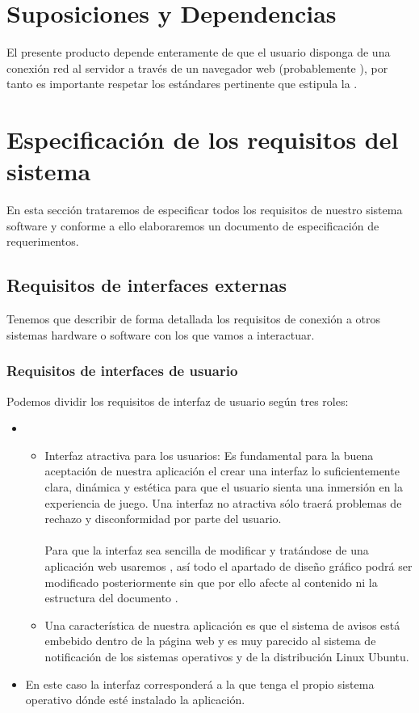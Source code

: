 \section{Suposiciones y Dependencias}
El presente producto depende enteramente de que el usuario disponga de una
conexión red al servidor a través de un navegador web (probablemente
), por tanto es importante respetar los estándares pertinente
que estipula la .

\section{Especificación de los requisitos del sistema}
En esta sección trataremos de especificar todos los requisitos de nuestro
sistema software y conforme a ello elaboraremos un documento de especificación
de requerimentos.
\subsection{Requisitos de interfaces externas}
Tenemos que describir de forma detallada los requisitos de conexión a otros
sistemas hardware o software con los que vamos a interactuar.
\subsubsection{Requisitos de interfaces de usuario}
Podemos dividir los requisitos de interfaz de usuario según tres roles:

\begin{itemize}
\item {}
  \begin{itemize}
  \item Interfaz atractiva para los usuarios: Es fundamental para la buena
    aceptación de nuestra aplicación el crear una interfaz lo suficientemente
    clara, dinámica y estética para que el usuario sienta una inmersión en la
    experiencia de juego. Una interfaz no atractiva sólo traerá problemas de
    rechazo y disconformidad por parte del usuario.\\\\
    Para que la interfaz sea sencilla de modificar y tratándose de una
    aplicación web usaremos , así todo el apartado
    de diseño gráfico podrá ser modificado posteriormente sin que por ello
    afecte al contenido ni la estructura del documento .
  \item Una característica de nuestra aplicación es que el sistema de avisos
    está embebido dentro de la página web y es muy parecido al sistema de
    notificación de los sistemas operativos  y de la \cursiva
    {distribución Linux Ubuntu}.
  \end{itemize}
\item {} En este caso la interfaz corresponderá a la que
  tenga el propio sistema operativo dónde esté instalado la aplicación.
\end{itemize}

